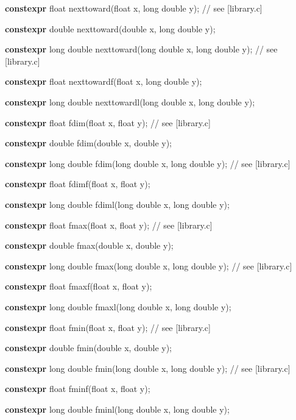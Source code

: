 \documentclass[prd,preprint,amsmath,amssymb,nofootinbib,eqsecnum]{revtex4-1}
\newcommand{\highlight}[1]{{\bf #1}}
\begin{document}
{\vspace{2ex}

\highlight{constexpr}  float nexttoward(float x, long double y); // see [library.c]

\highlight{constexpr}  double nexttoward(double x, long double y);

\highlight{constexpr}  long double nexttoward(long double x, long double y); // see [library.c]

\highlight{constexpr}  float nexttowardf(float x, long double y);

\highlight{constexpr}  long double nexttowardl(long double x, long double y);

\vspace{2ex}

\highlight{constexpr}  float fdim(float x, float y); // see [library.c]

\highlight{constexpr}  double fdim(double x, double y);

\highlight{constexpr}  long double fdim(long double x, long double y); // see [library.c]

\highlight{constexpr}  float fdimf(float x, float y);

\highlight{constexpr}  long double fdiml(long double x, long double y);

\vspace{2ex}

\highlight{constexpr}  float fmax(float x, float y); // see [library.c]

\highlight{constexpr}  double fmax(double x, double y);

\highlight{constexpr}  long double fmax(long double x, long double y); // see [library.c]

\highlight{constexpr}  float fmaxf(float x, float y);

\highlight{constexpr}  long double fmaxl(long double x, long double y);

\vspace{2ex}

\highlight{constexpr} float fmin(float x, float y); // see [library.c]

\highlight{constexpr}  double fmin(double x, double y);

\highlight{constexpr}  long double fmin(long double x, long double y); // see [library.c]

\highlight{constexpr}  float fminf(float x, float y);

\highlight{constexpr} long double fminl(long double x, long double y);

}
\end{document}
